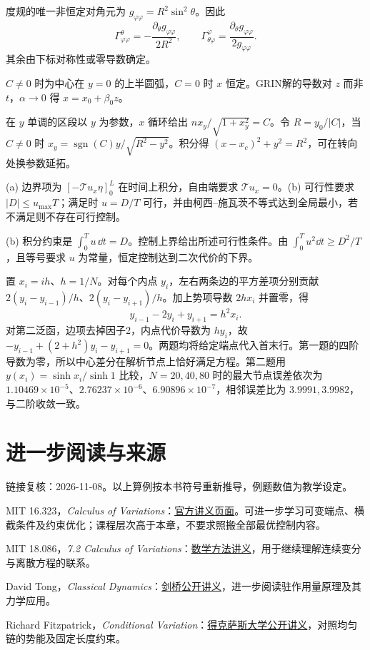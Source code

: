 \begin{bookexercises}
度规的唯一非恒定对角元为 $g_{\varphi\varphi}=R^2\sin^2\theta$。因此
\[
\Gamma^\theta_{\varphi\varphi}=-\frac{\partial_\theta g_{\varphi\varphi}}{2R^2},
\qquad
\Gamma^\varphi_{\theta\varphi}=\frac{\partial_\theta g_{\varphi\varphi}}{2g_{\varphi\varphi}}.
\]
其余由下标对称性或零导数确定。
\item $C\ne0$ 时为中心在 $y=0$ 的上半圆弧，$C=0$ 时 $x$ 恒定。GRIN解的导数对 $z$ 而非 $t$，$\alpha\to0$ 得 $x=x_0+\beta_0z$。

在 $y$ 单调的区段以 $y$ 为参数，$x$ 循环给出 $n x_y/\sqrt{1+x_y^2}=C$。令 $R=y_0/|C|$，当 $C\ne0$ 时 $x_y=\operatorname{sgn}(C)y/\sqrt{R^2-y^2}$。积分得 $(x-x_c)^2+y^2=R^2$，可在转向处换参数延拓。
\item (a) 边界项为 $[-\mathcal T u_x\eta]_0^L$ 在时间上积分，自由端要求 $\mathcal T u_x=0$。(b) 可行性要求 $|D|\le u_{\max}T$；满足时 $u=D/T$ 可行，并由柯西--施瓦茨不等式达到全局最小，若不满足则不存在可行控制。

(b) 积分约束是 $\int_0^T u\,\dd t=D$。控制上界给出所述可行性条件。由 $\int_0^T u^2\dd t\ge D^2/T$，且等号要求 $u$ 为常量，恒定控制达到二次代价的下界。
\item 置 $x_i=ih$、$h=1/N$。对每个内点 $y_i$，左右两条边的平方差项分别贡献 $2(y_i-y_{i-1})/h$、$2(y_i-y_{i+1})/h$。加上势项导数 $2hx_i$ 并置零，得
\[
y_{i-1}-2y_i+y_{i+1}=h^2x_i.
\]
对第二泛函，边项去掉因子2，内点代价导数为 $hy_i$，故 $-y_{i-1}+(2+h^2)y_i-y_{i+1}=0$。两题均将给定端点代入首末行。第一题的四阶导数为零，所以中心差分在解析节点上恰好满足方程。第二题用 $y(x_i)=\sinh x_i/\sinh1$ 比较，$N=20,40,80$ 时的最大节点误差依次为 $1.10469\times10^{-5}$、$2.76237\times10^{-6}$、$6.90896\times10^{-7}$，相邻误差比为 $3.9991,3.9982$，与二阶收敛一致。
\end{bookexercises}

\section*{进一步阅读与来源}
链接复核：2026-11-08。以上算例按本书符号重新推导，例题数值为教学设定。
\begin{bookreading}
\item MIT 16.323，\textit{Calculus of Variations}：\href{https://ocw.mit.edu/courses/16-323-principles-of-optimal-control-spring-2008/resources/lec5/}{官方讲义页面}。可进一步学习可变端点、横截条件及约束优化；课程层次高于本章，不要求照搬全部最优控制内容。
\item MIT 18.086，\textit{7.2 Calculus of Variations}：\href{https://ocw.mit.edu/courses/18-086-mathematical-methods-for-engineers-ii-spring-2006/e94c05947ed036cd6ad0150102087062_am72.pdf}{数学方法讲义}，用于继续理解连续变分与离散方程的联系。
\item David Tong，\textit{Classical Dynamics}：\href{https://davidtong.org/pdfs/teaching/classical-dynamics/clas2.pdf}{剑桥公开讲义}，进一步阅读驻作用量原理及其力学应用。
\item Richard Fitzpatrick，\textit{Conditional Variation}：\href{https://farside.ph.utexas.edu/teaching/sm1/Thermalhtml/node132.html}{得克萨斯大学公开讲义}，对照均匀链的势能及固定长度约束。
\end{bookreading}
